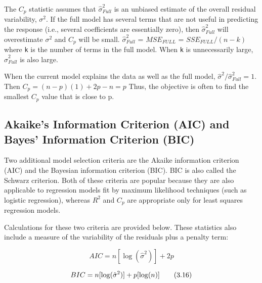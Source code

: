 \documentclass[
]{report}
\begin{document}
The \(\scriptstyle C_p\) statistic assumes that \(\scriptstyle \hat{\sigma}^2_{Full}\) is an unbiased estimate of the overall residual variability, \(\scriptstyle \sigma^2\). If the full model has several terms that are not useful in predicting the response (i.e., several coefficients are essentially zero), then \(\scriptstyle \hat{\sigma}^2_{Full}\) will overestimate \(\scriptstyle \sigma^2\) and \(\scriptstyle C_p\) will be small. \(\scriptstyle \hat{\sigma}^2_{Full}\) = \(\scriptstyle MSE_{FULL}\) = \(\scriptstyle SSE_{FULL}/(n-k)\) where \texttt{k} is the number of terms in the full model. When \texttt{k} is unnecessarily large, \(\scriptstyle \hat{\sigma}^2_{Full}\) is also large.

When the current model explains the data as well as the full model, \(\scriptstyle \hat{\sigma}^2 / \hat{\sigma}^2_{Full} = 1\). Then \(\scriptstyle C_p = (n - p)(1) + 2p - n = p\) Thus, the objective is often to find the smallest \(\scriptstyle C_p\) value that is close to p.

\hypertarget{akaikes-information-criterion-aic-and-bayes-information-criterion-bic}{%
\subsection*{Akaike's Information Criterion (AIC) and Bayes' Information Criterion (BIC)}\label{akaikes-information-criterion-aic-and-bayes-information-criterion-bic}}

Two additional model selection criteria are the Akaike information criterion (AIC) and the Bayesian information criterion (BIC). BIC is also called the Schwarz criterion. Both of these criteria are popular because they are also applicable to regression models fit by maximum likelihood techniques (such as logistic regression), whereas \(\scriptstyle {R}^2\) and \(\scriptstyle C_p\) are appropriate only for least squares regression models.

Calculations for these two criteria are provided below. These statistics also include a measure of the variability of the residuals plus a penalty term:

\begin{equation}
AIC = n[\log(\hat{\sigma}^2)] + 2p 
\tag{3.15}
\end{equation}

\begin{equation}
BIC = n[\log(\hat{\sigma}^2)] + p[\log(n)] \notag
\tag{3.16}
\end{equation}
\end{document}

